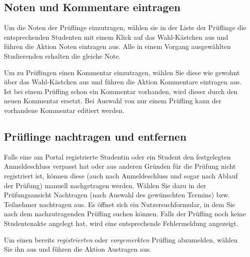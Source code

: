 \documentclass[a4paper,11pt]{article}
\newcommand{\knopf}[1]{{\sc #1}}
\begin{document}
\subsection{Noten und Kommentare eintragen}

Um die Noten der Prüflinge einzutragen, wählen sie in der Liste der Prüflinge
die entsprechenden Studenten mit einem
Klick auf das Wahl-Kästchen aus und führen die Aktion \knopf{Noten
  eintragen} aus. Alle in einem Vorgang ausgewählten Studierenden erhalten die
gleiche Note.

Um zu Prüflingen einen Kommentar einzutragen, wählen Sie diese
wie gewohnt über das Wahl-Kästchen aus und führen die Aktion \knopf{Kommentare
 eintragen} aus. Ist bei einem Prüfling schon ein Kommentar vorhanden,
wird dieser durch den neuen Kommentar ersetzt. Bei Auswahl von nur einem
Prüfling kann der vorhandene Kommentar editiert werden.

\subsection{Prüflinge nachtragen und entfernen}

Falls eine am Portal registrierte Studentin oder ein Student den festgelegten Anmeldeschluss
verpasst hat oder aus anderen Gründen für die Prüfung nicht registriert ist,
können diese (auch nach Anmeldeschluss und sogar nach Ablauf der Prüfung)
manuell nachgetragen werden. Wählen Sie dazu in der Prüfungsansicht \knopf{Nachtragen}
(nach Auswahl des gewünschten Termins) bzw. \knopf{Teilnehmer nachtragen}
aus. Es öffnet sich ein Nutzersuchformular, in dem Sie nach dem
nachzutragenden Prüfling suchen können. Falls der Prüfling
noch keine Studentenakte angelegt hat, wird eine entsprechende
Fehlermeldung angezeigt.

Um einen bereits {\em registrierten} oder {\em vorgemerkten} Prüfling abzumelden, wählen
Sie ihn aus und führen die Aktion \knopf{Austragen} aus.
\end{document}
